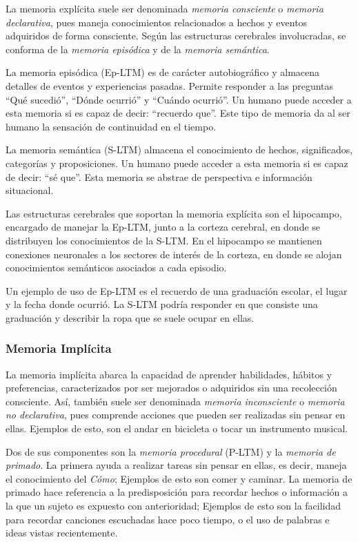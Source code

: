 La memoria explícita suele ser denominada \textit{memoria consciente} o \textit{memoria declarativa}, pues maneja conocimientos relacionados a hechos y eventos adquiridos de forma consciente. Según las estructuras cerebrales involucradas, se conforma de la \textit{memoria episódica} y de la \textit{memoria semántica}.

La memoria episódica (Ep-LTM) es de carácter  autobiográfico y almacena detalles de eventos y experiencias pasadas. Permite responder a las preguntas ``Qué sucedió'', ``Dónde ocurrió'' y ``Cuándo ocurrió''. Un humano puede acceder a esta memoria si es capaz de decir: ``recuerdo que''. Este tipo de memoria da al ser humano la sensación de continuidad en el tiempo.

La memoria semántica (S-LTM) almacena el conocimiento de hechos, significados, categorías y proposiciones. Un humano puede acceder a esta memoria si es capaz de decir: ``sé que''. Esta memoria se abstrae de perspectiva e información situacional.

Las estructuras cerebrales que soportan la memoria explícita son el hipocampo, encargado de manejar la Ep-LTM, junto a la corteza cerebral, en donde se distribuyen los conocimientos de la S-LTM. En el hipocampo se mantienen conexiones neuronales a los sectores de interés de la corteza, en donde se alojan conocimientos semánticos asociados a cada episodio.

Un ejemplo de uso de Ep-LTM es el recuerdo de una graduación escolar, el lugar y la fecha donde ocurrió. La S-LTM podría responder en que consiste una graduación y describir la ropa que se suele ocupar en ellas.


\subsubsection{Memoria Implícita}

La memoria implícita  abarca la capacidad de aprender habilidades, hábitos y preferencias, caracterizados por ser mejorados o adquiridos sin una recolección consciente. Así, también suele ser denominada \textit{memoria inconsciente} o \textit{memoria no declarativa}, pues comprende acciones que pueden ser realizadas sin pensar en ellas. Ejemplos de esto, son el andar en bicicleta o tocar un instrumento musical.

Dos de sus componentes son la \textit{memoria procedural} (P-LTM) y la \textit{memoria de primado}. La primera ayuda a realizar tareas sin pensar en ellas, es decir, maneja el conocimiento del \textit{Cómo}; Ejemplos de esto son comer y caminar. La memoria de primado hace referencia a la predisposición para recordar hechos o información a la que un sujeto es expuesto con anterioridad; Ejemplos de esto son la facilidad para recordar canciones escuchadas hace poco tiempo, o el uso de palabras e ideas vistas recientemente.

